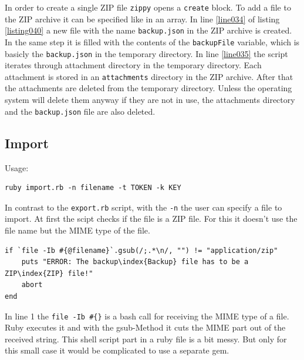 In order to create a single ZIP file \texttt{zippy} opens a \lstinline{create} block. To add a file to the ZIP archive it can be specified like in an array. In  line \ref{line034} of listing \ref{listing040} a new file with the name \texttt{backup.json} in the ZIP archive is created. In the same step it is filled with the contents of the \lstinline{backupFile} variable, which is basicly the \texttt{backup.json} in the temporary directory. In line \ref{line035} the script iterates through attachment directory in the temporary directory. Each attachment is stored in an \texttt{attachments} directory in the ZIP archive. After that the attachments are deleted from the temporary directory. Unless the operating system will delete them anyway if they are not in use, the attachments directory and the \texttt{backup.json} file are also deleted.




\subsection{Import}

Usage:
\begin{lstlisting}[aboveskip=1\baselineskip, style=bash, caption=\texttt{import.rb} usage., label=listing041]
ruby import.rb -n filename -t TOKEN -k KEY
\end{lstlisting}

In contrast to the \texttt{export.rb} script, with the \texttt{-n} the user can specify a file to import. At first the scipt checks if the file is a ZIP file. For this it doesn't use the file name but the MIME type of the file.

\begin{lstlisting}[aboveskip=1\baselineskip, caption=Checking if the file has the MIME type \textquotedblleft application/zip\textquotedblright, label=listing008]
if `file -Ib #{@filename}`.gsub(/;.*\n/, "") != "application/zip"
	puts "ERROR: The backup\index{Backup} file has to be a ZIP\index{ZIP} file!"
	abort
end
\end{lstlisting}

	
In line 1 the \texttt{file -Ib \#\{\@filename\}} is a bash call for receiving the MIME type of a file. Ruby executes it and with the gsub-Method it cuts the MIME part out of the received string. This shell script part in a ruby file is a bit messy. But only for this small case it would be complicated to use a separate gem.

